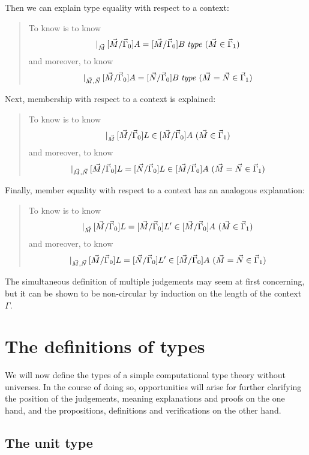 \documentclass[main.tex]{subfiles}
\begin{document}
Then we can explain type equality with respect to a context:

\begin{quote}
  To know  is to know
  \[\lvert_{\vec{M}}\,[\vec{M}/\vec\Gamma_0]A=[\vec{M}/\vec\Gamma_0]B\;\mathit{type}\ (\vec{M}\in\vec\Gamma_1)\]
  and moreover, to know
  \[\lvert_{\vec{M},\vec{N}}\,[\vec{M}/\vec\Gamma_0]A =
  [\vec{N}/\vec\Gamma_0]B\;\mathit{type}\ (\vec{M}=\vec{N}\in\vec\Gamma_1)\]
\end{quote}

Next, membership with respect to a context is explained:

\begin{quote}
  To know  is to know
  \[\lvert_{\vec{M}}\,[\vec{M}/\vec\Gamma_0]L\in[\vec{M}/\vec\Gamma_0]A\ (\vec{M}\in\vec\Gamma_1)\]
  and moreover, to know
  \[\lvert_{\vec{M},\vec{N}}\,[\vec{M}/\vec\Gamma_0]L = [\vec{N}/\vec\Gamma_0]L\in[\vec{M}/\vec\Gamma_0]A\ (\vec{M}=\vec{N}\in\vec\Gamma_1)\]
\end{quote}

Finally, member equality with respect to a context has an analogous explanation:

\begin{quote}
  To know  is to know
  \[\lvert_{\vec{M}}\,[\vec{M}/\vec\Gamma_0]L=[\vec{M}/\vec\Gamma_0]L'\in[\vec{M}/\vec\Gamma_0]A\ (\vec{M}\in\vec\Gamma_1)\]
  and moreover, to know
  \[\lvert_{\vec{M},\vec{N}}\,[\vec{M}/\vec\Gamma_0]L = [\vec{N}/\vec\Gamma_0]L'\in[\vec{M}/\vec\Gamma_0]A\ (\vec{M}=\vec{N}\in\vec\Gamma_1)\]
\end{quote}

The simultaneous definition of multiple judgements may seem at first
concerning, but it can be shown to be non-circular by induction on the length
of the context $\Gamma$.

\section{The definitions of types}

We will now define the types of a simple computational type theory without
universes. In the course of doing so, opportunities will arise for further
clarifying the position of the judgements, meaning explanations and proofs on
the one hand, and the propositions, definitions and verifications on the other
hand.

\subsection{The unit type}
\end{document}
